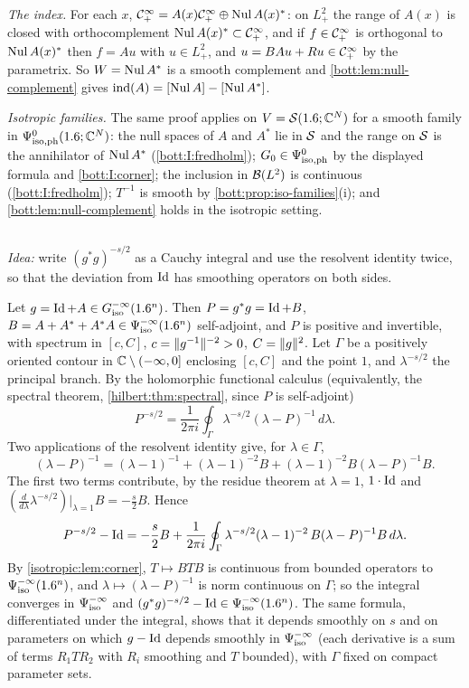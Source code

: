 \emph{The index.} For each $x$, $\mathcal{C}^\infty_+=A(x)\mathcal{C}^\infty_+\oplus\operatorname{Nul} A(x)^*$: on $L^2_+$ the range of $A(x)$
is closed with orthocomplement $\operatorname{Nul} A(x)^*\subset\mathcal{C}^\infty_+$, and if $f\in\mathcal{C}^\infty_+$ is orthogonal to
$\operatorname{Nul} A(x)^*$ then $f=Au$ with $u\in L^2_+$, and $u=BAu+Ru\in\mathcal{C}^\infty_+$ by the parametrix. So
$W=\operatorname{Nul} A^*$ is a smooth complement and \cref{bott:lem:null-complement} gives
$\operatorname{ind}(A)=[\operatorname{Nul} A]-[\operatorname{Nul} A^*]$.

\emph{Isotropic families.} The same proof applies on $V=\mathcal{S}(1.6;\mathbb{C}^N)$ for a smooth family in
$\Psi^{0}_{\mathrm{iso,ph}}(1.6;\mathbb{C}^N)$: the null spaces of $A$ and $A^*$ lie in $\mathcal{S}$ and the range on $\mathcal{S}$ is
the annihilator of $\operatorname{Nul} A^*$ (\ref{bott:I:fredholm}); $G_0\in\Psi^{0}_{\mathrm{iso,ph}}$ by the displayed
formula and \ref{bott:I:corner}; the inclusion in $\mathcal{B}(L^2)$ is continuous
(\ref{bott:I:fredholm}); $T^{-1}$ is smooth by \cref{bott:prop:iso-families}(i); and
\cref{bott:lem:null-complement} holds in the isotropic setting.

\subsection*{}
\emph{Idea:} write $(g^*g)^{-s/2}$ as a Cauchy integral and use the resolvent identity twice,
so that the deviation from $\operatorname{Id}$ has smoothing operators on both sides.

Let $g=\operatorname{Id}+A\in G^{-\infty}_{\mathrm{iso}}(1.6^n)$. Then $P=g^*g=\operatorname{Id}+B$, $B=A+A^*+A^*A\in\Psi^{-\infty}_{\mathrm{iso}}(1.6^n)$
self-adjoint, and $P$ is positive and invertible, with spectrum in $[c,C]$,
$c=\lVert g^{-1}\rVert^{-2}>0$, $C=\lVert g\rVert^2$. Let $\Gamma$ be a positively oriented contour in
$\mathbb{C}\setminus(-\infty,0]$ enclosing $[c,C]$ and the point $1$, and $\lambda^{-s/2}$ the
principal branch. By the holomorphic functional calculus (equivalently, the spectral theorem,
\cref{hilbert:thm:spectral}, since $P$ is self-adjoint)
\begin{equation*}
  P^{-s/2}=\frac1{2\pi i}\oint_\Gamma\lambda^{-s/2}(\lambda-P)^{-1}\,d\lambda .
\end{equation*}
Two applications of the resolvent identity give, for $\lambda\in\Gamma$,
\begin{equation*}
  (\lambda-P)^{-1}=(\lambda-1)^{-1}+(\lambda-1)^{-2}B+(\lambda-1)^{-2}B(\lambda-P)^{-1}B .
\end{equation*}
The first two terms contribute, by the residue theorem at $\lambda=1$,
$1\cdot\operatorname{Id}$ and $(\frac{d}{d\lambda}\lambda^{-s/2})|_{\lambda=1}B=-\frac s2B$. Hence
\begin{equation*}
  P^{-s/2}-\operatorname{Id}=-\frac s2B+\frac1{2\pi i}\oint_\Gamma\lambda^{-s/2}(\lambda-1)^{-2}\,
  B(\lambda-P)^{-1}B\,d\lambda .
\end{equation*}
By \cref{isotropic:lem:corner}, $T\mapsto BTB$ is continuous from bounded operators to
$\Psi^{-\infty}_{\mathrm{iso}}(1.6^n)$, and $\lambda\mapsto(\lambda-P)^{-1}$ is norm continuous on $\Gamma$; so
the integral converges in $\Psi^{-\infty}_{\mathrm{iso}}$ and $(g^*g)^{-s/2}-\operatorname{Id}\in\Psi^{-\infty}_{\mathrm{iso}}(1.6^n)$.
The same formula, differentiated under the integral, shows that it depends smoothly on $s$ and on
parameters on which $g-\operatorname{Id}$ depends smoothly in $\Psi^{-\infty}_{\mathrm{iso}}$ (each derivative is a sum of
terms $R_1TR_2$ with $R_i$ smoothing and $T$ bounded), with $\Gamma$ fixed on compact parameter
sets.

